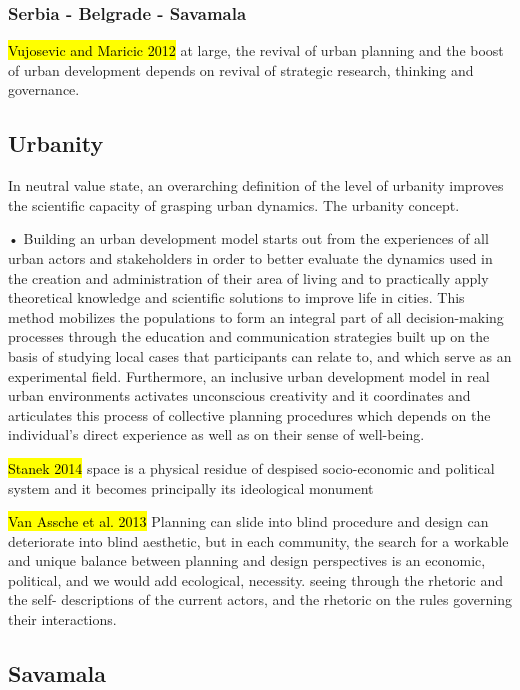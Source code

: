 \documentclass[11pt]{report}
\begin{document}
\subsubsection{Serbia - Belgrade - Savamala}
\hl{Vujosevic and Maricic 2012}
at large, the revival of urban planning and the boost of urban development depends on revival of strategic research, thinking and governance.
    
\subsection{Urbanity}

In neutral value state, an overarching definition of the level of urbanity improves the scientific capacity of grasping urban dynamics. The urbanity concept.

•	Building an urban development model starts out from the experiences of all urban actors and stakeholders in order to better evaluate the dynamics used in the creation and administration of their area of living and to practically apply theoretical knowledge and scientific solutions to improve life in cities. This method mobilizes the populations to form an integral part of all decision-making processes through the education and communication strategies built up on the basis of studying local cases that participants can relate to, and which serve as an experimental field. Furthermore, an inclusive urban development model in real urban environments activates unconscious creativity and it coordinates and articulates this process of collective planning procedures which depends on the individual's direct experience as well as on their sense of well-being.

\hl{Stanek 2014}
space is a physical residue of despised socio-economic and political system and it becomes principally its ideological monument

\hl{Van Assche et al. 2013}
Planning can slide into blind procedure and design can deteriorate into blind aesthetic, but in each community, the search for a workable and unique balance between planning and design perspectives is an economic, political, and we
would add ecological, necessity.
seeing through the rhetoric and the self- descriptions of the current actors, and the rhetoric on the rules governing their interactions.

\subsection{Savamala}
\end{document}
